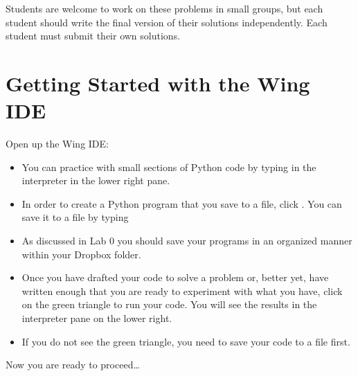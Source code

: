 \documentclass[letterpaper,10pt,english]{sphinxmanual}
\begin{document}
Students are welcome to work on these problems in small groups, but
each student should write the final version of their solutions
independently.  Each student must submit their own solutions.


\section{Getting Started with the Wing IDE}
\label{\detokenize{lecture_notes/lec02_calculator_exercises/exercises:getting-started-with-the-wing-ide}}
Open up the Wing IDE:
\begin{itemize}
\item {} 
You can practice with small sections of Python code by typing in the
interpreter in the lower right pane.

\item {} 
In order to create a Python program that you save to a file, click
.  You can save it to a file by typing 

\item {} 
As discussed in Lab 0 you should save your programs in an organized
manner within your Dropbox folder.

\item {} 
Once you have drafted your code to solve a problem or, better yet,
have written enough that you are ready to experiment with what you
have, click on the green triangle to run your code.  You will see
the results in the interpreter pane on the lower right.

\item {} 
If you do not see the green triangle, you need to save your code
to a file first.

\end{itemize}

Now you are ready to proceed…
\end{document}
